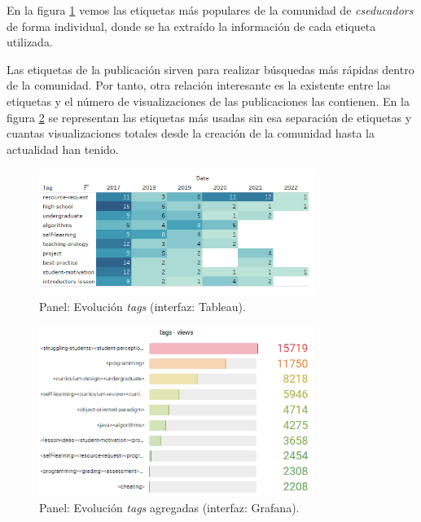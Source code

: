 \documentclass[a4paper, 12pt]{book}
\begin{document}
En la figura \ref{figura:evo_tags_anual} vemos las etiquetas más populares de la comunidad de \emph{cseducadors} de forma individual, donde se ha extraído la información de cada etiqueta utilizada. 

Las etiquetas de la publicación sirven para realizar búsquedas más rápidas dentro de la comunidad. Por tanto, otra relación interesante es la existente entre las etiquetas y el número de visualizaciones de las publicaciones las contienen. En la figura \ref{figura:evo_tags} se representan las etiquetas más usadas sin esa separación de etiquetas y cuantas visualizaciones totales desde la creación de la comunidad hasta la actualidad han tenido. 

\begin{figure}[ht]
    \centering
    \includegraphics[width=0.8\textwidth]{img/cse/tags_evo.png}
    \caption{Panel: Evolución \emph{tags} (interfaz: Tableau).}
    \label{figura:evo_tags_anual}
\end{figure}

\begin{figure}[ht]
    \centering
    \includegraphics[width=0.8\textwidth]{img/cse/evo_tags.png}
    \caption{Panel: Evolución \emph{tags} agregadas (interfaz: Grafana).}
    \label{figura:evo_tags}
\end{figure}
\end{document}
